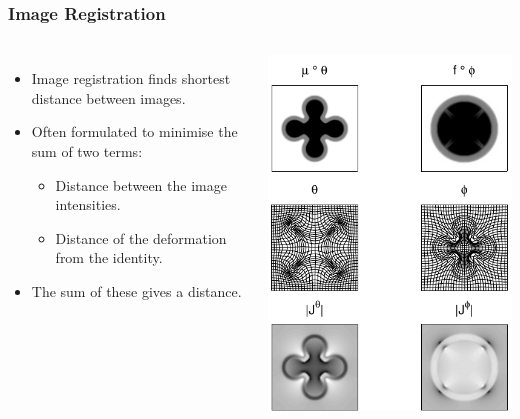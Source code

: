 \begin{frame}
\frametitle{Image Registration}
\begin{columns}[c]
\begin{itemize}
\item Image registration finds shortest distance between images.
\item Often formulated to minimise the sum of two terms:
\begin{itemize}
\item Distance between the image intensities.
\item Distance of the deformation from the identity.
\end{itemize}
\item The sum of these gives a distance.
\end{itemize}
\includegraphics[width=\textwidth]{shoot2d}
\end{columns}
\end{frame}

